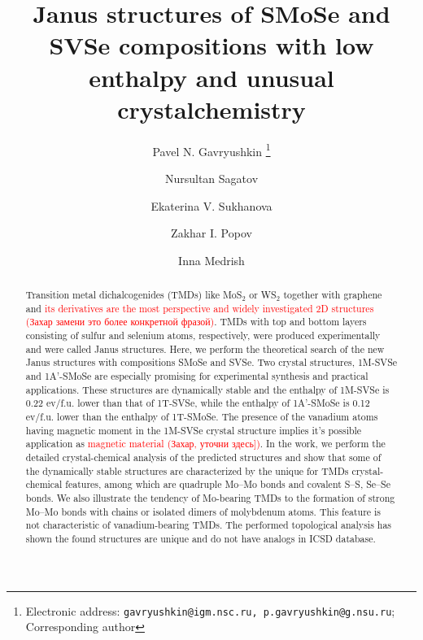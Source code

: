\documentclass[a4paperm]{article}
\begin{document}

\title{Janus structures of SMoSe and SVSe compositions with low enthalpy and unusual crystalchemistry}


\author[1,2,3]{Pavel N. Gavryushkin
   \thanks{Electronic address: \texttt{gavryushkin@igm.nsc.ru, p.gavryushkin@g.nsu.ru}; Corresponding author}}     
\author[2]{Nursultan Sagatov}
\author[1]{Ekaterina V. Sukhanova}
\author[1]{Zakhar I. Popov}
\author[4]{Inna Medrish}



\date{}
\maketitle


\begin{abstract}
Transition metal dichalcogenides (TMDs) like MoS$_2$ or WS$_2$ together with graphene and \textcolor{red}{its derivatives are the most perspective and widely investigated 2D structures (Захар замени это более конкретной фразой)}.
TMDs with top and bottom layers consisting of sulfur and selenium atoms, respectively, were produced experimentally and were called Janus structures.
Here, we perform the theoretical search of the new Janus structures with compositions SMoSe and SVSe.
Two crystal structures, 1M-SVSe and 1A'-SMoSe are especially promising for experimental synthesis and practical applications.
These structures are dynamically stable and the enthalpy of 1M-SVSe is 0.22 ev/f.u. lower than that of 1T-SVSe, while the enthalpy of 1A'-SMoSe is 0.12 ev/f.u. lower than the enthalpy of 1T-SMoSe.
The presence of the vanadium atoms having magnetic moment in the 1M-SVSe crystal structure implies it's possible application as \textcolor{red}{magnetic material (Захар, уточни здесь])}.
In the work, we perform the detailed crystal-chemical analysis of the predicted structures and show that some of the dynamically stable structures are characterized by the unique for TMDs crystal-chemical features, among which are quadruple Mo--Mo bonds and covalent S--S, Se--Se bonds.
We also illustrate the tendency of Mo-bearing TMDs to the formation of strong Mo--Mo bonds with chains or isolated  dimers of molybdenum atoms.
This feature is not characteristic of vanadium-bearing TMDs.
The performed topological analysis has shown the found structures are unique and do not have analogs in ICSD database.

\end{abstract}
\end{document}
